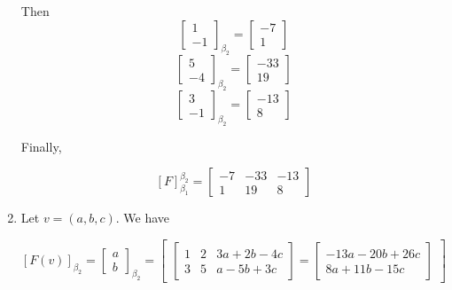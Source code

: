 \documentclass{report}
\begin{document}
\begin{Example}
\begin{enumerate}
            Then
            $$\begin{bmatrix}
                1 \\ -1
            \end{bmatrix}_{\beta_2} = \begin{bmatrix}
                -7 \\ 1
            \end{bmatrix}$$
            $$\begin{bmatrix}
                5 \\ -4
            \end{bmatrix}_{\beta_2} = \begin{bmatrix}
                -33 \\ 19
            \end{bmatrix}$$
            $$\begin{bmatrix}
                3 \\ -1
            \end{bmatrix}_{\beta_2} = \begin{bmatrix}
                -13 \\ 8
            \end{bmatrix}$$

            Finally,

            $$[F]_{\beta_1}^{\beta_2} = \begin{bmatrix}
                -7 & -33 & -13 \\
                1 & 19 & 8
            \end{bmatrix}$$

            \item Let $v = (a, b, c)$. We have

            $$[F(v)]_{\beta_2} = \begin{bmatrix}
                a \\ b
            \end{bmatrix}_{\beta_2} = \begin{bmatrix}
                \begin{bmatrix}
                    1 & 2 & 3a + 2b - 4c \\
                    3 & 5 & a - 5b + 3c
                \end{bmatrix} = \begin{bmatrix}
                    -13a - 20b + 26c \\
                    8a + 11b - 15c
                \end{bmatrix}
            \end{bmatrix}$$


\end{enumerate}
\end{Example}
\end{document}
